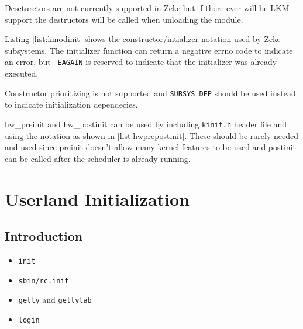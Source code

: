Descturctors are not currently supported in Zeke but if there ever will be LKM
support the destructors will be called when unloading the module.

Listing \ref{list:kmodinit} shows the constructor/intializer notation used by
Zeke subsystems. The initializer function can return a negative errno code to
indicate an error, but \verb+-EAGAIN+ is reserved to indicate that the
initializer was already executed.



Constructor prioritizing is not supported and \verb+SUBSYS_DEP+ should be used
instead to indicate initialization dependecies.

hw\_preinit and hw\_postinit can be used by including \verb+kinit.h+ header file
and using the notation as shown in \ref{list:hwprepostinit}. These should be
rarely needed and used since preinit doesn't allow many kernel features to be
used and postinit can be called after the scheduler is already running.




\chapter{Userland Initialization}

\section{Introduction}

\begin{itemize}
    \item \verb+init+
    \item \verb+sbin/rc.init+
    \item \verb+getty+ and \verb+gettytab+
    \item \verb+login+
\end{itemize}
